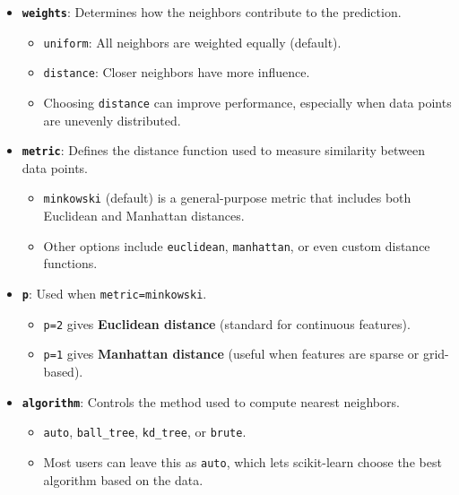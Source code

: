 \documentclass[
  letterpaper,
  DIV=11,
  numbers=noendperiod]{scrreprt}
\providecommand{\tightlist}{%
  \setlength{\itemsep}{0pt}\setlength{\parskip}{0pt}}\usepackage{longtable,booktabs,array}
\begin{document}
\begin{itemize}
\tightlist
\item
  \textbf{\texttt{weights}}: Determines how the neighbors contribute to
  the prediction.

  \begin{itemize}
  \tightlist
  \item
    \texttt{\textquotesingle{}uniform\textquotesingle{}}: All neighbors
    are weighted equally (default).\\
  \item
    \texttt{\textquotesingle{}distance\textquotesingle{}}: Closer
    neighbors have more influence.\\
  \item
    Choosing \texttt{\textquotesingle{}distance\textquotesingle{}} can
    improve performance, especially when data points are unevenly
    distributed.
  \end{itemize}
\item
  \textbf{\texttt{metric}}: Defines the distance function used to
  measure similarity between data points.

  \begin{itemize}
  \tightlist
  \item
    \texttt{\textquotesingle{}minkowski\textquotesingle{}} (default) is
    a general-purpose metric that includes both Euclidean and Manhattan
    distances.\\
  \item
    Other options include
    \texttt{\textquotesingle{}euclidean\textquotesingle{}},
    \texttt{\textquotesingle{}manhattan\textquotesingle{}}, or even
    custom distance functions.
  \end{itemize}
\item
  \textbf{\texttt{p}}: Used when
  \texttt{metric=\textquotesingle{}minkowski\textquotesingle{}}.

  \begin{itemize}
  \tightlist
  \item
    \texttt{p=2} gives \textbf{Euclidean distance} (standard for
    continuous features).\\
  \item
    \texttt{p=1} gives \textbf{Manhattan distance} (useful when features
    are sparse or grid-based).
  \end{itemize}
\item
  \textbf{\texttt{algorithm}}: Controls the method used to compute
  nearest neighbors.

  \begin{itemize}
  \tightlist
  \item
    \texttt{\textquotesingle{}auto\textquotesingle{}},
    \texttt{\textquotesingle{}ball\_tree\textquotesingle{}},
    \texttt{\textquotesingle{}kd\_tree\textquotesingle{}}, or
    \texttt{\textquotesingle{}brute\textquotesingle{}}.\\
  \item
    Most users can leave this as
    \texttt{\textquotesingle{}auto\textquotesingle{}}, which lets
    scikit-learn choose the best algorithm based on the data.
  \end{itemize}
\end{itemize}
\end{document}
